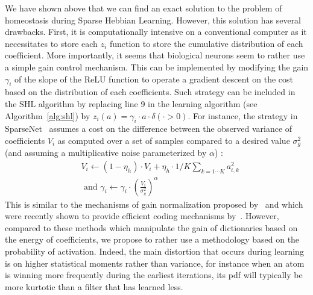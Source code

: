 \documentclass[vision,article,submit,oneauthor,pdftex]{Definitions/mdpi}
\newcommand{\seeFig}[1]{Figure~\ref{fig:#1}}%
\begin{document}
We have shown above that we can find an exact solution to the problem of homeostasis during Sparse Hebbian Learning. However, this solution has several drawbacks. First, it is computationally intensive on a conventional computer as it necessitates to store each $z_i$ function to store the cumulative distribution of each coefficient. More importantly, it seems that biological neurons seem to rather use a simple gain control mechanism. This can be implemented by modifying the gain $\gamma_i$ of the slope of the ReLU function to operate a gradient descent on the cost based on the distribution of each coefficients. Such strategy can be included in the SHL algorithm by replacing line 9 in the learning algorithm (see Algorithm~\ref{alg:shl}) by $z_i( a ) = \gamma_i \cdot a \cdot \delta(\cdot >0)$. For instance, the strategy in {\sc SparseNet}~\citep{Olshausen97} assumes a cost on the difference between the observed variance of coefficients $V_i$ as computed over a set of samples compared to a desired value $\sigma_g^2$ (and assuming a multiplicative noise parameterized by $\alpha$) :
\begin{align}
&V_i \leftarrow (1- \eta_h ) \cdot V_i + \eta_h \cdot 1/K\sum_{k=1\cdots K} a_{i, k}^2 \\ &\textrm{ and }
\gamma_i \leftarrow \gamma_i \cdot \left( \frac{V_i}{\sigma_g^2} \right)^\alpha
\end{align}%
This is similar to the mechanisms of gain normalization proposed by~\cite{Schwartz01} and which were recently shown to provide efficient coding mechanisms by~\cite{Simoncelli01}. However, compared to these methods which manipulate the gain of dictionaries based on the energy of coefficients, we propose to rather use a methodology based on the probability of activation. Indeed, the main distortion that occurs during learning is on higher statistical moments rather than variance, for instance when an atom is winning more frequently during the earliest iterations, its pdf will typically be more kurtotic than a filter that has learned less.
\end{document}
